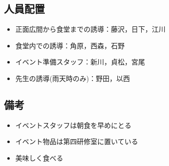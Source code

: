\subsection{人員配置}
\begin{itemize}
\item 正面広間から食堂までの誘導：藤沢，日下，江川
\item 食堂内での誘導：角原，西森，石野
\item イベント準備スタッフ：新川，貞松，宮尾
  \item 先生の誘導(雨天時のみ)：野田，以西
\end{itemize}



\subsection{備考}
\begin{itemize}
\item イベントスタッフは朝食を早めにとる
\item イベント物品は第四研修室に置いている
\item 美味しく食べる


\end{itemize}

%

